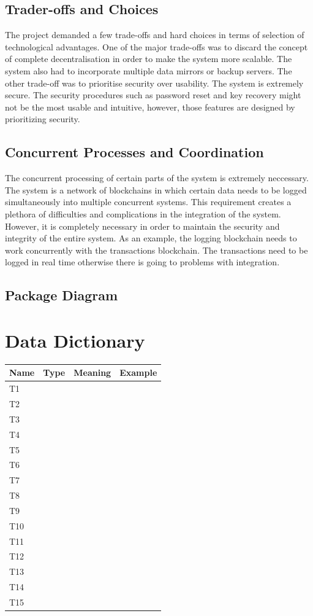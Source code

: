 \documentclass[a4paper,twoside,phd]{BYUPhys}
\begin{document}
\subsection{Trader-offs and Choices}
The project demanded a few trade-offs and hard choices in terms of selection of technological advantages. One of the major trade-offs was to discard the concept of complete decentralisation in order to make the system more scalable. The system also had to incorporate multiple data mirrors or backup servers. The other trade-off was to prioritise security over usability. The system is extremely secure. The security procedures such as password reset and key recovery might not be the most usable and intuitive, however, those features are designed by prioritizing security.
\subsection{Concurrent Processes and Coordination}
The concurrent processing of certain parts of the system is extremely neccessary. The system is a network of blockchains in which certain data needs to be logged simultaneously into multiple concurrent systems. This requirement creates a plethora of difficulties and complications in the integration of the system. However, it is completely necessary in order to maintain the security and integrity of the entire system. As an example, the logging blockchain needs to work concurrently with the transactions blockchain. The transactions need to be logged in real time otherwise there is going to problems with integration.
\subsection{Package Diagram}
\section{Data Dictionary}
\setlength{\arrayrulewidth}{0.2mm}
\setlength{\tabcolsep}{18pt}
\renewcommand{\arraystretch}{2.5}
 
{
\begin{longtable}{ |p{2.5cm}|p{2.5cm}|p{2.5cm}|p{2.5cm}|  }
\hline
\bf{Name} & \bf{Type} & \bf{Meaning} & \bf{Example}\\
\hline
T1 &   &   &   \\
T2 &   &   &   \\
T3 &   &   &   \\
T4 &   &   &   \\
T5 &   &   &   \\
T6 &   &   &   \\
T7 &   &   &   \\
T8 &   &   &   \\
T9 &   &   &   \\
T10 &   &   &   \\
T11 &   &   &   \\
T12 &   &   &   \\
T13 &   &   &   \\
T14 &   &   &   \\
T15 &   &   &   \\
\hline
\end{longtable}
}
\end{document}
